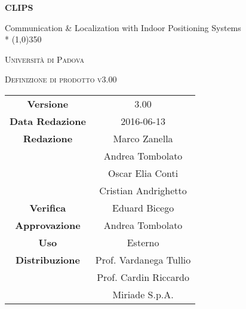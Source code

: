 \documentclass[a4paper,12pt]{article}
\author{}
\date{03/03/2016}
\begin{document}
\begin{titlepage}
	\centering
	{\huge\bfseries CLIPS\par}
	Communication \& Localization with Indoor Positioning Systems \\*
	\line(1,0){350} \\
	{\scshape\LARGE Università di Padova \par}
	\vspace{1cm}
	{\scshape\Large Definizione di prodotto v3.00\par}
	\logo
	
	\vfill \vfill
		\begin{tabular}{c|c}
			{\hfill \textbf{Versione}} 			& 3.00				\\
			{\hfill\textbf{Data Redazione}} 	& 2016-06-13	\\
			{\hfill\textbf{Redazione}} 			& Marco Zanella \\
												& Andrea Tombolato \\
												& Oscar Elia Conti \\
												& Cristian Andrighetto \\
			{\hfill\textbf{Verifica}} 			& Eduard Bicego \\
			{\hfill\textbf{Approvazione}} 		& Andrea Tombolato		\\ 
			{\hfill\textbf{Uso}} 				& Esterno			\\ 
			{\hfill\textbf{Distribuzione}} 		& Prof. Vardanega Tullio \\
												& Prof. Cardin Riccardo \\
												& Miriade S.p.A. \\
		\end{tabular}
	\end{titlepage}
	
	\newpage
	\pagestyle{myfront}
		
	\newpage
		\tableofcontents
	\newpage
		\listoffigures	
	\label{LastFrontPage}
	\newpage
	
	\pagestyle{mymain}
	
	\newpage
		
		
	\newpage
		
		
	\newpage
		
		
	\newpage
			
		
	\newpage
		
		
	\newpage
		
		
	\newpage
		
		
		
		
	\label{LastPage}
\end{document}
